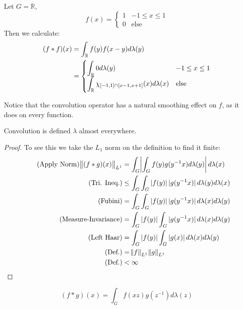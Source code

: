 \begin{example}
Let $G = \mathbb{R}$, 
\begin{equation}
f(x) = \begin{cases}
1 & -1 \leq x \leq 1 \\
0 & \text{else}
\end{cases}
\end{equation}
Then we calculate:
\begin{align*}
(f \ast f)(x) &= \int_\mathbb{R} f(y)f(x-y) d\lambda(y) \\
&= 
\begin{cases}
\displaystyle
\int_\mathbb{R} 0 d\lambda(y) & -1 \leq x \leq 1 \\
\displaystyle
\int_\mathbb{R} \chi_{\intcc{-1,1}\cap\intcc{x-1,x+1}}(x) d\lambda(x) & \text{else}
\end{cases} 
\end{align*}

Notice that the convolution operator has a natural smoothing effect on $f$, as it does on every function.

\end{example}

\begin{lemma}
Convolution is defined $\lambda$ almost everywhere. 
\end{lemma}

\begin{proof}To see this we take the $L_1$ norm on the definition to find it finite:
\begin{align*}
\tag{Apply Norm}
 \norm{(f \ast g)(x)}_{L^1} &= \int_G \abs{ \int_G f(y) g(y^{-1}x) d\lambda(y) } d\lambda(x) 
\\ 
\tag{Tri. Ineq.}
&\leq \int_G \int_G \abs[0]{f(y)} \abs[0]{g(y^{-1}x)} d\lambda(y) d\lambda(x) \\
 \tag{Fubini}
&=  \int_G \int_G \abs[0]{f(y)} \abs[0]{g(y^{-1}x)} d\lambda(x) d\lambda(y) \\
 \tag{Measure-Invariance}
&=  \int_G \abs[0]{f(y)} \int_G  \abs[0]{g(y^{-1}x)} d\lambda(x) d\lambda(y) \\
 \tag{Left Haar}
&=  \int_G \abs[0]{f(y)} \int_G  \abs[0]{g(x)} d\lambda(x) d\lambda(y) \\
 \tag{Def.}
 &= \norm{f}_{L^1} \norm{g}_{L^1} \\
 \tag{Def.}
 &< \infty
\end{align*}
\end{proof}

\begin{lemma}
\begin{equation*}
(f \ast g)(x) = \int_G f(xz)g(z^{-1}) d\lambda(z)
\end{equation*}
\end{lemma}

